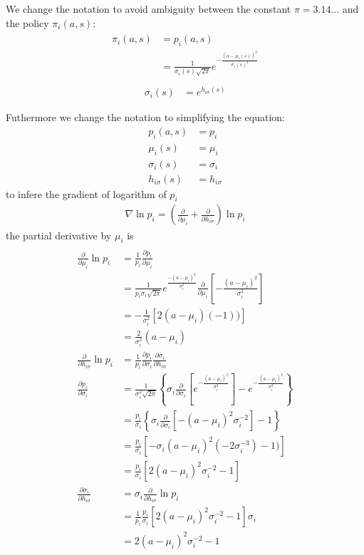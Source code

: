 \documentclass[]{article}
\begin{document}
We change the notation to avoid ambiguity between the constant $ \pi = 3.14 \dots $ and the policy $ \pi_i(a,s) $:
\begin{align}
\begin{split}
\pi_i(a, s)&	= p_i(a, s)
\\
&			= \frac{1}{\sigma_i(s) \sqrt{2 \pi}} e^{-\frac{(a - \mu_i(s))^2}{\sigma_i(s)^2}}
\\
\end{split}
\end{align}
\begin{align}
\sigma_i(s)&	= e^{h_{i\sigma}(s)}	
\end{align}

Futhermore we change the notation to simplifying the equation:
\begin{align*}
p_i(a, s)& = p_i
\\
\mu_i(s)& = \mu_i
\\
\sigma_i(s)& = \sigma_i
\\
h_{i\sigma}(s)& = h_{i\sigma}
\end{align*}
to infere the gradient of logarithm of $ p_i $
\begin{align*}
\nabla \ln p_i = \left(
\frac{\partial}{\partial \mu_i} + \frac{\partial}{\partial h_{i\sigma}}
\right)
\ln p_i
\end{align*}
the partial derivative by $ \mu_i $ is 
\begin{align*}
\\
\frac{\partial}{\partial \mu_i} \ln p_i& = \frac{1}{p_i} \frac{\partial p_i}{\partial \mu_i}
\\
& = \frac{1}{p_i \sigma_i \sqrt{2 \pi} } e^{\frac{-(a-\mu_i)^2}{\sigma_i^2}} \frac{\partial}{\partial \mu_i} \left[ -\frac{(a-\mu_i)^2}{\sigma_i^2} \right]
\\
& = - \frac{1}{\sigma_i^2}[2 (a - \mu_i) (-1))]
\\
& = \frac{2}{\sigma_i^2}(a - \mu_i)
\\
\frac{\partial}{\partial h_{i\sigma}} \ln p_i& = \frac{1}{p_i} \frac{\partial p_i}{\partial \sigma_i} \frac{\partial \sigma_i}{\partial h_{i\sigma}}
\\
\frac{\partial p_i}{\partial \sigma_i}& = \frac{1}{\sigma_i^2 \sqrt{2 \pi}}
\left\{
\sigma_i \frac{\partial}{\partial \sigma_i}
\left[
e^{-\frac{(a-\mu_i)^2}{\sigma_i^2}}
\right]
- e^{-\frac{(a-\mu_i)^2}{\sigma_i^2}}
\right\}
\\
& = \frac{p_i}{\sigma_i}
\left\{
\sigma_i \frac{\partial}{\partial \sigma_i}
\left[
-(a - \mu_i)^2\sigma_i^{-2}
\right] - 1
\right\}
\\
& = \frac{p_i}{\sigma_i}
\left[
-\sigma_i (a - \mu_i)^2 (-2 \sigma_i^{-3}) - 1)
\right]
\\
& = \frac{p_i}{\sigma_i}
\left[
2(a-\mu_i)^2 \sigma_i^{-2} - 1
\right]
\\
\frac{\partial \sigma_i}{\partial h_{i\sigma}}& = \sigma_i
\frac{\partial}{\partial h_{i\sigma}} \ln p_i
\\
& = \frac{1}{p_i}
\frac{p_i}{\sigma_i}
\left[
2(a-\mu_i)^2 \sigma_i^{-2} - 1
\right] \sigma_i
\\
& = 2(a-\mu_i)^2 \sigma_i^{-2} - 1
\end{align*}
\end{document}
